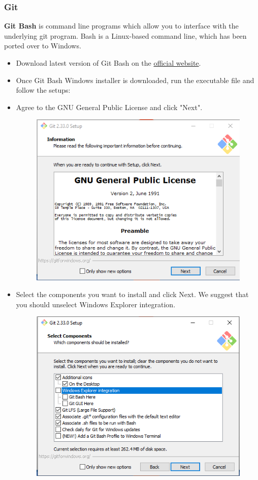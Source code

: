 \documentclass[10pt]{article} %
\begin{document}
    \subsubsection{Git}

      \textbf{Git Bash} is command line programs which allow you to interface with the underlying git program.
      Bash is a Linux-based command line, which has been ported over to Windows.
      \begin{itemize}
        \item  Download latest version of Git Bash on the \href{http://gitforwindows.org/}{official website}.
        \item Once Git Bash Windows installer is downloaded, run the executable file and follow the setups:
        \item Agree to the GNU General Public License and click "Next".
        \begin{figure}[h!]
          \centering
          \includegraphics[width=0.58\linewidth]{figs/GitBash1}
          \caption{}
          \label{fig:gitbash1}
        \end{figure}

        \item Select the components you want to install and click Next.
        We suggest that you should unselect Windows Explorer integration.

        \begin{figure}[h!]
          \centering
          \includegraphics[width=0.55\linewidth]{figs/git2}
          \caption{}
          \label{fig:gitbash3}
        \end{figure}


\end{itemize}
\end{document}
